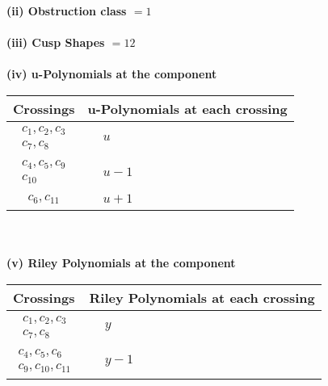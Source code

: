 \documentclass[1p]{elsarticle_modified}
\theoremstyle{definition}
\begin{document}
\flushleft \textbf{(ii) Obstruction class $= 1$}\\~\\
\flushleft \textbf{(iii) Cusp Shapes $= 12$}\\~\\
\newpage\renewcommand{\arraystretch}{1}
\flushleft \textbf{(iv) u-Polynomials at the component}\newline \\
\begin{tabular}{m{50pt}|m{274pt}}
Crossings & \hspace{64pt}u-Polynomials at each crossing \\
\hline $$\begin{aligned}c_{1},c_{2},c_{3}\\c_{7},c_{8}\end{aligned}$$&$\begin{aligned}
&u
\end{aligned}$\\
\hline $$\begin{aligned}c_{4},c_{5},c_{9}\\c_{10}\end{aligned}$$&$\begin{aligned}
&u-1
\end{aligned}$\\
\hline $$\begin{aligned}c_{6},c_{11}\end{aligned}$$&$\begin{aligned}
&u+1
\end{aligned}$\\
\hline
\end{tabular}\\~\\
\newpage\renewcommand{\arraystretch}{1}
\flushleft \textbf{(v) Riley Polynomials at the component}\newline \\
\begin{tabular}{m{50pt}|m{274pt}}
Crossings & \hspace{64pt}Riley Polynomials at each crossing \\
\hline $$\begin{aligned}c_{1},c_{2},c_{3}\\c_{7},c_{8}\end{aligned}$$&$\begin{aligned}
&y
\end{aligned}$\\
\hline $$\begin{aligned}c_{4},c_{5},c_{6}\\c_{9},c_{10},c_{11}\end{aligned}$$&$\begin{aligned}
&y-1
\end{aligned}$\\
\hline
\end{tabular}\\~\\
\end{document}
